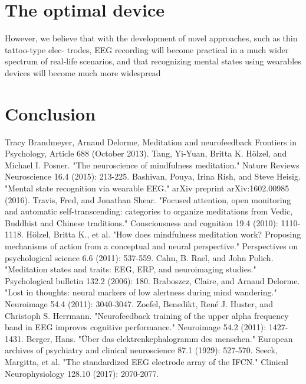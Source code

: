 \documentclass{llncs} %
\begin{document}
\section{The optimal device}
However, we believe that with the development of novel approaches, such as thin tattoo-type elec- trodes, EEG recording will become practical in a much wider spectrum of real-life scenarios, and that recognizing mental states using wearables devices will become much more widespread \cite{Bashivan: et al}
\section{Conclusion}

\newpage
\begin{thebibliography}{[MT1]}
    Tracy Brandmeyer, Arnaud Delorme,
    Meditation and neurofeedback
    Frontiers in Psychology, Article 688 (October 2013).
    Tang, Yi-Yuan, Britta K. Hölzel, and Michael I. Posner. "The neuroscience of mindfulness meditation." Nature Reviews Neuroscience 16.4 (2015): 213-225.
    Bashivan, Pouya, Irina Rish, and Steve Heisig. "Mental state recognition via wearable EEG." arXiv preprint arXiv:1602.00985 (2016).    
    Travis, Fred, and Jonathan Shear. "Focused attention, open monitoring and automatic self-transcending: categories to organize meditations from Vedic, Buddhist and Chinese traditions." Consciousness and cognition 19.4 (2010): 1110-1118.
    Hölzel, Britta K., et al. "How does mindfulness meditation work? Proposing mechanisms of action from a conceptual and neural perspective." Perspectives on psychological science 6.6 (2011): 537-559.
    Cahn, B. Rael, and John Polich. "Meditation states and traits: EEG, ERP, and neuroimaging studies." Psychological bulletin 132.2 (2006): 180.
    Braboszcz, Claire, and Arnaud Delorme. "Lost in thoughts: neural markers of low alertness during mind wandering." Neuroimage 54.4 (2011): 3040-3047.
    Zoefel, Benedikt, René J. Huster, and Christoph S. Herrmann. "Neurofeedback training of the upper alpha frequency band in EEG improves cognitive performance." Neuroimage 54.2 (2011): 1427-1431.
    Berger, Hans. "Über das elektrenkephalogramm des menschen." European archives of psychiatry and clinical neuroscience 87.1 (1929): 527-570.
    Seeck, Margitta, et al. "The standardized EEG electrode array of the IFCN." Clinical Neurophysiology 128.10 (2017): 2070-2077.

\end{thebibliography}
\end{document}
